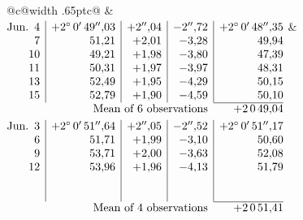 \noindent\begin{tabular}{@{}c@{\hspace{.4em}\vrule width .65pt\hspace{.4em}}c@{}}
 &
 \\[.18ex]
\(\begin{array}[t]{@{}r|r|r|r|r@{}}
\text{Jun.}\enspace 4 & +2^\circ\,0'\,49''{,}03 & +2''{,}04 & -2''{,}72 & +2^\circ\,0'\,48''{,}35\\
7 & 51{,}21 & +2{,}01 & -3{,}28 & 49{,}94\\
10 & 49{,}21 & +1{,}98 & -3{,}80 & 47{,}39\\
11 & 50{,}31 & +1{,}97 & -3{,}97 & 48{,}31\\
13 & 52{,}49 & +1{,}95 & -4{,}29 & 50{,}15\\
15 & 52{,}79 & +1{,}90 & -4{,}59 & 50{,}10\\
\cline{5-5}
\multicolumn{4}{r}{\text{Mean of 6 observations}} & +2\,0\,49{,}04
\end{array}\)
&
\(\begin{array}[t]{@{}r|r|r|r|r@{}}
\text{Jun.}\enspace 3 & +2^\circ\,0'\,51''{,}64 & +2''{,}05 & -2''{,}52 & +2^\circ\,0'\,51''{,}17\\
6 & 51{,}71 & +1{,}99 & -3{,}10 & 50{,}60\\
9 & 53{,}71 & +2{,}00 & -3{,}63 & 52{,}08\\
12 & 53{,}96 & +1{,}96 & -4{,}13 & 51{,}79\\
 & & & & \\
 & & & & \\
\cline{5-5}
\multicolumn{4}{r}{\text{Mean of 4 observations}} & +2\,0\,51{,}41
\end{array}\)
\end{tabular}\par\medskip

\par\clearpage
\noindent\makebox[12mm][l]{}\par\medskip

